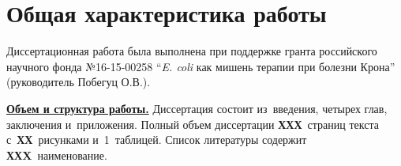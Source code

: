 \section*{Общая характеристика работы}
\newcommand{\actuality}{\pdfbookmark[1]{Актуальность и разработанность темы}{actuality}\underline{\textbf{\actualityTXT}}}
\newcommand{\aim}{\pdfbookmark[1]{Цели}{aim}\underline{{\textbf\aimTXT}}}
\newcommand{\tasks}{\pdfbookmark[1]{Задачи}{tasks}\underline{\textbf{\tasksTXT}}}
\newcommand{\aimtasks}{\pdfbookmark[1]{Цели и задачи}{aimtasks}\aimtasksTXT}
\newcommand{\novelty}{\pdfbookmark[1]{Научная новизна}{novelty}\underline{\textbf{\noveltyTXT}}}
\newcommand{\influence}{\pdfbookmark[1]{Практическая значимость}{influence}\underline{\textbf{\influenceTXT}}}
\newcommand{\defpositions}{\pdfbookmark[1]{Положения, выносимые на защиту}{defpositions}\underline{\textbf{\defpositionsTXT}}}
\newcommand{\reliability}{\pdfbookmark[1]{Достоверность}{reliability}\underline{\textbf{\reliabilityTXT}}}
\newcommand{\contribution}{\pdfbookmark[1]{Личный вклад}{contribution}\underline{\textbf{\contributionTXT}}}
\newcommand{\publications}{\pdfbookmark[1]{Публикации}{publications}\underline{\textbf{\publicationsTXT}}}


Диссертационная работа была выполнена при поддержке гранта российского научного фонда №16-15-00258 ``\textit{E. coli} как мишень терапии при болезни Крона'' (руководитель Побегуц О.В.).

\underline{\textbf{Объем и структура работы.}} Диссертация состоит из~введения,
четырех глав, заключения и~приложения. Полный объем диссертации
\textbf{ХХХ}~страниц текста с~\textbf{ХХ}~рисунками и~1~таблицей. Список
литературы содержит \textbf{ХХX}~наименование.




